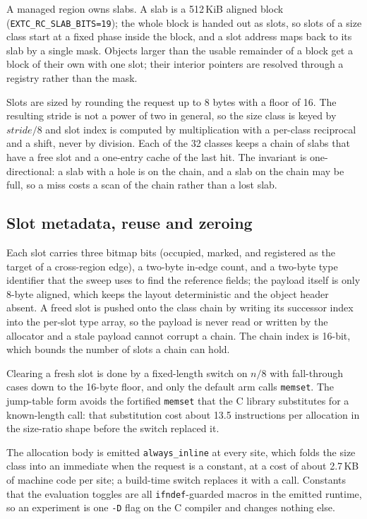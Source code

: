 A managed region owns slabs.  A slab is a 512\,KiB aligned block
(\texttt{EXTC\_RC\_SLAB\_BITS=19}); the whole block is handed out as slots, so slots of a
size class start at a fixed phase inside the block, and a slot address maps back to its slab by
a single mask.  Objects larger than the usable remainder of a block get a block of their own with
one slot; their interior pointers are resolved through a registry rather than the mask.

Slots are sized by rounding the request up to 8 bytes with a floor of 16.  The resulting stride
is not a power of two in general, so the size class is keyed by $stride/8$ and slot index is
computed by multiplication with a per-class reciprocal and a shift, never by division.  Each of
the 32 classes keeps a chain of slabs that have a free slot and a one-entry cache of the last
hit.  The invariant is one-directional: a slab with a hole is on the chain, and a slab on the
chain may be full, so a miss costs a scan of the chain rather than a lost slab.

\subsection{Slot metadata, reuse and zeroing}
\label{sec:impl-meta}

Each slot carries three bitmap bits (occupied, marked, and registered as the target of a
cross-region edge), a two-byte in-edge count, and a two-byte type identifier that the sweep uses
to find the reference fields; the payload itself is only 8-byte aligned, which keeps the layout
deterministic and the object header absent.  A freed slot is pushed onto the class chain by
writing its successor index into the per-slot type array, so the payload is never read or
written by the allocator and a stale payload cannot corrupt a chain.  The chain index is 16-bit,
which bounds the number of slots a chain can hold.

Clearing a fresh slot is done by a fixed-length switch on $n/8$ with fall-through cases down
to the 16-byte floor, and only the default arm calls \texttt{memset}.  The jump-table form
avoids the fortified \texttt{memset} that the C library substitutes for a known-length call:
that substitution cost about 13.5 instructions per allocation in the size-ratio shape before the
switch replaced it.

The allocation body is emitted \texttt{always\_inline} at every site, which folds the size class
into an immediate when the request is a constant, at a cost of about 2.7\,KB of machine code per
site; a build-time switch replaces it with a call.  Constants that the evaluation toggles are
all \texttt{ifndef}-guarded macros in the emitted runtime, so an experiment is one \texttt{-D}
flag on the C compiler and changes nothing else.

